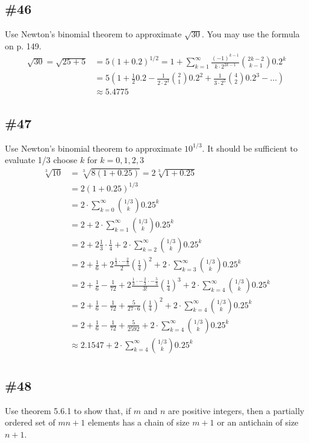 \documentclass{article}
\begin{document}
\subsection*{\#46}
Use Newton's binomial theorem to approximate $\sqrt{30}$. You may use the formula on p. 149.
\begin{align*}
  \sqrt{30}=\sqrt{25+5}&=5(1+0.2)^{1/2}=1+\sum\limits_{k=1}^\infty{\frac{(-1)^{k-1}}{k\cdot2^{2k-1}}\binom{2k-2}{k-1}0.2^k}\\
  &=5\left(1+\frac{1}{2}0.2-\frac{1}{2\cdot2^3}\binom{2}{1}0.2^2+\frac{1}{3\cdot2^5}\binom{4}{2}0.2^3-\dots\right)\\
  &\approx5.4775
\end{align*}
\subsection*{\#47}
Use Newton's binomial theorem to approximate $10^{1/3}$. It should be sufficient to evaluate 1/3 choose $k$ for $k=0,1,2,3$
\begin{align*}
  \sqrt[3]{10}&=\sqrt[3]{8(1+0.25)}=2\sqrt[3]{1+0.25}\\
  &=2(1+0.25)^{1/3}\\
  &=2\cdot\sum\limits_{k=0}^\infty{\binom{1/3}{k}0.25^k}\\
  &=2+2\cdot\sum\limits_{k=1}^\infty{\binom{1/3}{k}0.25^k}\\
  &=2+2\frac{1}{3}\cdot\frac{1}{4}+2\cdot\sum\limits_{k=2}^\infty{\binom{1/3}{k}0.25^k}\\
  &=2+\frac{1}{6}+2\frac{\frac{1}{3}\cdot-\frac{2}{3}}{2}\left(\frac{1}{4}\right)^2+2\cdot\sum\limits_{k=3}^\infty{\binom{1/3}{k}0.25^k}\\
  &=2+\frac{1}{6}-\frac{1}{72}+2\frac{\frac{1}{3}\cdot-\frac{2}{3}\cdot-\frac{5}{3}}{3!}\left(\frac{1}{4}\right)^3+2\cdot\sum\limits_{k=4}^\infty{\binom{1/3}{k}0.25^k}\\
  &=2+\frac{1}{6}-\frac{1}{72}+\frac{5}{27\cdot6}\left(\frac{1}{4}\right)^2+2\cdot\sum\limits_{k=4}^\infty{\binom{1/3}{k}0.25^k}\\
  &=2+\frac{1}{6}-\frac{1}{72}+\frac{5}{2592}+2\cdot\sum\limits_{k=4}^\infty{\binom{1/3}{k}0.25^k}\\
  &\approx2.1547+2\cdot\sum\limits_{k=4}^\infty{\binom{1/3}{k}0.25^k}\\
\end{align*}
\subsection*{\#48}
Use theorem 5.6.1 to show that, if $m$ and $n$ are positive integers, then a partially ordered set of $mn+1$ elements has a chain of size $m+1$ or an antichain of size $n+1$.
\end{document}
